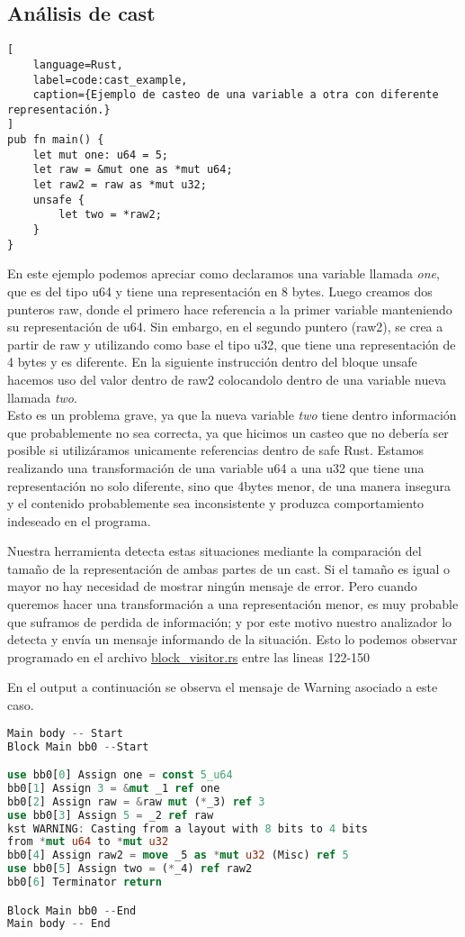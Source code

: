 \subsection{Análisis de cast}

\begin{lstlisting}[
    language=Rust,
    label=code:cast_example,
    caption={Ejemplo de casteo de una variable a otra con diferente representación.}
]
pub fn main() {
    let mut one: u64 = 5;
    let raw = &mut one as *mut u64;
    let raw2 = raw as *mut u32;
    unsafe {
        let two = *raw2;
    }
}
\end{lstlisting}

En este ejemplo podemos apreciar como declaramos una variable llamada \textit{one}, que es del tipo u64 y tiene una representación en 8 bytes. Luego creamos dos punteros raw, donde el primero hace referencia a la primer variable manteniendo su representación de u64. Sin embargo, en el segundo puntero (raw2), se crea a partir de raw y utilizando como base el tipo u32, que tiene una representación de 4 bytes y es diferente. En la siguiente instrucción dentro del bloque unsafe hacemos uso del valor dentro de raw2 colocandolo dentro de una variable nueva llamada \textit{two}.\\
Esto es un problema grave, ya que la nueva variable \textit{two} tiene dentro información que probablemente no sea correcta, ya que hicimos un casteo que no debería ser posible si utilizáramos unicamente referencias dentro de safe Rust. Estamos realizando una transformación de una variable u64 a una u32 que tiene una representación no solo diferente, sino que 4bytes menor, de una manera insegura y el contenido probablemente sea inconsistente y produzca comportamiento indeseado en el programa.

Nuestra herramienta detecta estas situaciones mediante la comparación del tamaño de la representación de ambas partes de un cast. Si el tamaño es igual o mayor no hay necesidad de mostrar ningún mensaje de error. Pero cuando queremos hacer una transformación a una representación menor, es muy probable que suframos de perdida de información; y por este motivo nuestro analizador lo detecta y envía un mensaje informando de la situación. Esto lo podemos observar programado en el archivo \href{run:../src/mir_visitor/block_visitor.rs}{block\_visitor.rs} entre las lineas 122-150

En el output a continuación se observa el mensaje de Warning asociado a este caso.

\begin{lstlisting}[language=rust]
Main body -- Start
Block Main bb0 --Start

use bb0[0] Assign one = const 5_u64
bb0[1] Assign 3 = &mut _1 ref one
bb0[2] Assign raw = &raw mut (*_3) ref 3
use bb0[3] Assign 5 = _2 ref raw
kst WARNING: Casting from a layout with 8 bits to 4 bits
from *mut u64 to *mut u32
bb0[4] Assign raw2 = move _5 as *mut u32 (Misc) ref 5
use bb0[5] Assign two = (*_4) ref raw2
bb0[6] Terminator return

Block Main bb0 --End
Main body -- End
\end{lstlisting}

